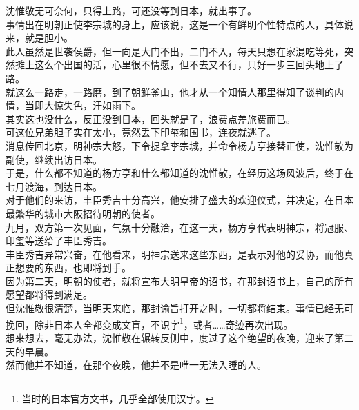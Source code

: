 \begin{multicols}{\theparacolNo}
沈惟敬无可奈何，只得上路，可还没等到日本，就出事了。\\

事情出在明朝正使李宗城的身上，应该说，这是一个有鲜明个性特点的人，具体说来，就是胆小。\\

此人虽然是世袭侯爵，但一向是大门不出，二门不入，每天只想在家混吃等死，突然摊上这么个出国的活，心里很不情愿，但不去又不行，只好一步三回头地上了路。\\

就这么一路走，一路磨，到了朝鲜釜山，他才从一个知情人那里得知了谈判的内情，当即大惊失色，汗如雨下。\\

其实这也没什么，反正没到日本，回头就是了，浪费点差旅费而已。\\

可这位兄弟胆子实在太小，竟然丢下印玺和国书，连夜就逃了。\\

消息传回北京，明神宗大怒，下令捉拿李宗城，并命令杨方亨接替正使，沈惟敬为副使，继续出访日本。\\

于是，什么都不知道的杨方亨和什么都知道的沈惟敬，在经历这场风波后，终于在七月渡海，到达日本。\\

对于他们的来访，丰臣秀吉十分高兴，他安排了盛大的欢迎仪式，并决定，在日本最繁华的城市大阪招待明朝的使者。\\

九月，双方第一次见面，气氛十分融洽，在这一天，杨方亨代表明神宗，将冠服、印玺等送给了丰臣秀吉。\\

丰臣秀吉异常兴奋，在他看来，明神宗送来这些东西，是表示对他的妥协，而他真正想要的东西，也即将到手。\\

因为第二天，明朝的使者，就将宣布大明皇帝的诏书，在那封诏书上，自己的所有愿望都将得到满足。\\

但沈惟敬很清楚，当明天来临，那封谕旨打开之时，一切都将结束。事情已经无可挽回，除非日本人全都变成文盲，不识字\footnote{当时的日本官方文书，几乎全部使用汉字。}，或者……奇迹再次出现。\\

想来想去，毫无办法，沈惟敬在辗转反侧中，度过了这个绝望的夜晚，迎来了第二天的早晨。\\

然而他并不知道，在那个夜晚，他并不是唯一无法入睡的人。\\


\end{multicols}
